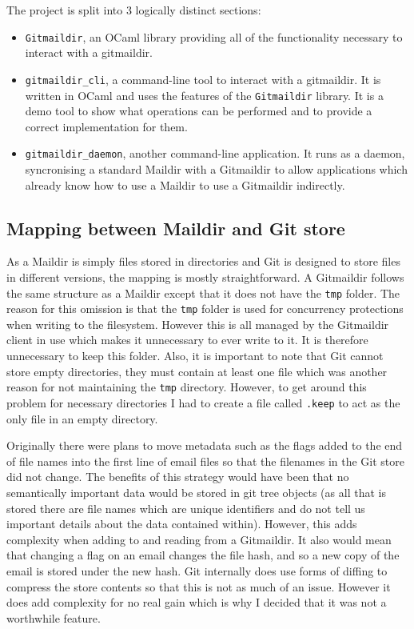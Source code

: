 The project is split into 3 logically distinct sections:
\begin{itemize}
  \item \texttt{Gitmaildir}, an OCaml library providing all of the functionality necessary to interact with a gitmaildir.
  \item \texttt{gitmaildir\_cli}, a command-line tool to interact with a gitmaildir. It is written in OCaml and uses the features of the \texttt{Gitmaildir} library. It is a demo tool to show what operations can be performed and to provide a correct implementation for them.
  \item \texttt{gitmaildir\_daemon}, another command-line application. It runs as a daemon, syncronising a standard Maildir with a Gitmaildir to allow applications which already know how to use a Maildir to use a Gitmaildir indirectly.
\end{itemize}

\subsection{Mapping between Maildir and Git store} \label{section:mapping}

As a Maildir is simply files stored in directories and Git is designed to store files in different versions, the mapping is mostly straightforward. A Gitmaildir follows the same structure as a Maildir except that it does not have the \texttt{tmp} folder. The reason for this omission is that the \texttt{tmp} folder is used for concurrency protections when writing to the filesystem. However this is all managed by the Gitmaildir client in use which makes it unnecessary to ever write to it. It is therefore unnecessary to keep this folder. Also, it is important to note that Git cannot store empty directories, they must contain at least one file which was another reason for not maintaining the \texttt{tmp} directory. However, to get around this problem for necessary directories I had to create a file called \texttt{.keep} to act as the only file in an empty directory.

Originally there were plans to move metadata such as the flags added to the end of file names into the first line of email files so that the filenames in the Git store did not change. The benefits of this strategy would have been that no semantically important data would be stored in git tree objects (as all that is stored there are file names which are unique identifiers and do not tell us important details about the data contained within). However, this adds complexity when adding to and reading from a Gitmaildir. It also would mean that changing a flag on an email changes the file hash, and so a new copy of the email is stored under the new hash. Git internally does use forms of diffing to compress the store contents so that this is not as much of an issue. However it does add complexity for no real gain which is why I decided that it was not a worthwhile feature.

